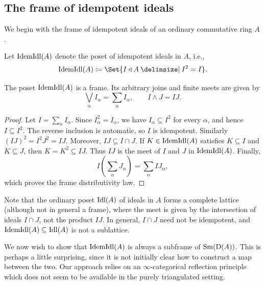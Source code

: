 \documentclass{amsart}
\begin{document}
    \subsection{The frame of idempotent ideals}
    We begin with the frame of idempotent ideals of an ordinary commutative ring $A$.
    \begin{Def}
        Let $\mathrm{IdemIdl}(A)$ denote the poset of idempotent ideals in $A$, i.e., 
        \[
        \Idem{A} \coloneqq \Set{I \triangleleft A \given I^2 = I}. 
        \]
    \end{Def}
    \begin{Lem}\label{lem:idempotent-frame} The poset $\mathrm{IdemIdl}(A)$ is a frame.  Its arbitrary joins and finite meets are given by
    \[ 
    \bigvee_{\alpha} I_\alpha=\sum_\alpha I_\alpha,  \qquad  I\wedge J=IJ. 
    \]
    \end{Lem}
    \begin{proof}
    Let $I=\sum_\alpha I_\alpha$. Since $I_\alpha^2=I_\alpha$, we have $I_\alpha\subseteq I^2$ for every $\alpha$, and hence $I\subseteq I^2$. The reverse inclusion is automatic, so $I$ is idempotent.  Similarly $(IJ)^2 = I^2J^2 = IJ$. Moreover, $IJ\subseteq I\cap J$. If $K\in \mathrm{IdemIdl}(A)$ satisfies $K\subseteq I$ and $K\subseteq J$, then $K=K^2\subseteq IJ$. Thus $IJ$ is the meet of $I$ and $J$ in $\mathrm{IdemIdl}(A)$. Finally,
    \[
    I\left(\sum_\alpha J_\alpha\right)=\sum_\alpha IJ_\alpha,
    \]
    which proves the frame distributivity law.
    \end{proof}
    \begin{Rem}
        Note that the ordinary poset $\operatorname{Idl}(A)$ of ideals in $A$ forms a complete lattice (although not in general a frame), where the meet is given by the intersection of ideals $I \cap J$, not the product $IJ$. In general, $I \cap J$ need not be idempotent, and $\mathrm{IdemIdl}(A) \subseteq \operatorname{Idl}(A)$ is not a sublattice. 
    \end{Rem}

    We now wish to show that $\mathrm{IdemIdl}(A)$ is always a subframe of $\operatorname{Sm}(\operatorname{D}(A))$. This is perhaps a little surprising, since it is not initially clear how to construct a map between the two. Our approach relies on an $\infty$-categorical reflection principle which does not seem to be available in the purely triangulated setting. 
\end{document}
